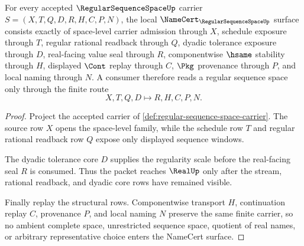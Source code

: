\begin{theorem}
\label{thm:regular-sequence-space-namecert-obligations}
For every accepted $\RegularSequenceSpaceUp$ carrier $S=(X,T,Q,D,R,H,C,P,N)$, the local $\NameCert_{\RegularSequenceSpaceUp}$ surface consists exactly of space-level carrier admission through $X$, schedule exposure through $T$, regular rational readback through $Q$, dyadic tolerance exposure through $D$, real-facing value seal through $R$, componentwise $\hsame$ stability through $H$, displayed $\Cont$ replay through $C$, $\Pkg$ provenance through $P$, and local naming through $N$. A consumer therefore reads a regular sequence space only through the finite route
$$
X,T,Q,D \longmapsto R,H,C,P,N .
$$
\end{theorem}
\begin{proof}
Project the accepted carrier of \autoref{def:regular-sequence-space-carrier}. The source row $X$ opens the space-level family, while the schedule row $T$ and regular rational readback row $Q$ expose only displayed sequence windows.

The dyadic tolerance core $D$ supplies the regularity scale before the real-facing seal $R$ is consumed. Thus the packet reaches $\RealUp$ only after the stream, rational readback, and dyadic core rows have remained visible.

Finally replay the structural rows. Componentwise transport $H$, continuation replay $C$, provenance $P$, and local naming $N$ preserve the same finite carrier, so no ambient complete space, unrestricted sequence space, quotient of real names, or arbitrary representative choice enters the NameCert surface.
\end{proof}


